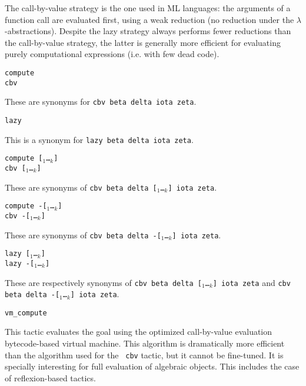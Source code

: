 The call-by-value strategy is the one used in ML languages: the
arguments of a function call are evaluated first, using a weak
reduction (no reduction under the $\lambda$-abstractions). Despite the
lazy strategy always performs fewer reductions than the call-by-value
strategy, the latter is generally more efficient for evaluating purely
computational expressions (i.e. with few dead code).

\begin{Variants}
\item {\tt compute} \\
      {\tt cbv}
  
  These are synonyms for {\tt cbv beta delta iota zeta}.

\item {\tt lazy}
  
  This is a synonym for {\tt lazy beta delta iota zeta}.

\item {\tt compute [\qualid$_1$\ldots\qualid$_k$]}\\
      {\tt cbv [\qualid$_1$\ldots\qualid$_k$]}

  These are synonyms of {\tt cbv beta delta
  [\qualid$_1$\ldots\qualid$_k$] iota zeta}.
  
\item {\tt compute -[\qualid$_1$\ldots\qualid$_k$]}\\
      {\tt cbv -[\qualid$_1$\ldots\qualid$_k$]}

  These are synonyms of {\tt cbv beta delta
  -[\qualid$_1$\ldots\qualid$_k$] iota zeta}.

\item {\tt lazy [\qualid$_1$\ldots\qualid$_k$]}\\
      {\tt lazy -[\qualid$_1$\ldots\qualid$_k$]}

  These are respectively synonyms of {\tt cbv beta delta
  [\qualid$_1$\ldots\qualid$_k$] iota zeta} and {\tt cbv beta delta
  -[\qualid$_1$\ldots\qualid$_k$] iota zeta}.

\item {\tt vm\_compute} 

  This tactic evaluates the goal using the optimized call-by-value
  evaluation bytecode-based virtual machine. This algorithm is
  dramatically more efficient than the algorithm used for the {\tt
  cbv} tactic, but it cannot be fine-tuned. It is specially
  interesting for full evaluation of algebraic objects. This includes
  the case of reflexion-based tactics.

\end{Variants}

